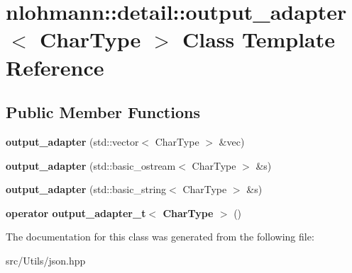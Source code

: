 \hypertarget{classnlohmann_1_1detail_1_1output__adapter}{}\section{nlohmann\+:\+:detail\+:\+:output\+\_\+adapter$<$ Char\+Type $>$ Class Template Reference}
\label{classnlohmann_1_1detail_1_1output__adapter}
\subsection*{Public Member Functions}
\begin{DoxyCompactItemize}
\item 
\mbox{\label{classnlohmann_1_1detail_1_1output__adapter_a117bda35bc3de85fd2f5f2153d9705b4}} 
{\bfseries output\+\_\+adapter} (std\+::vector$<$ Char\+Type $>$ \&vec)
\item 
\mbox{\label{classnlohmann_1_1detail_1_1output__adapter_ac086bc101f246eb815e46f17a9e68a4a}} 
{\bfseries output\+\_\+adapter} (std\+::basic\+\_\+ostream$<$ Char\+Type $>$ \&s)
\item 
\mbox{\label{classnlohmann_1_1detail_1_1output__adapter_a07f996a817ffb420022cea56425f7d5c}} 
{\bfseries output\+\_\+adapter} (std\+::basic\+\_\+string$<$ Char\+Type $>$ \&s)
\item 
\mbox{\label{classnlohmann_1_1detail_1_1output__adapter_adee7a0e124f483d9945b8b85c73d7957}} 
{\bfseries operator output\+\_\+adapter\+\_\+t$<$ Char\+Type $>$} ()
\end{DoxyCompactItemize}


The documentation for this class was generated from the following file\+:\begin{DoxyCompactItemize}
\item 
src/\+Utils/json.\+hpp\end{DoxyCompactItemize}

